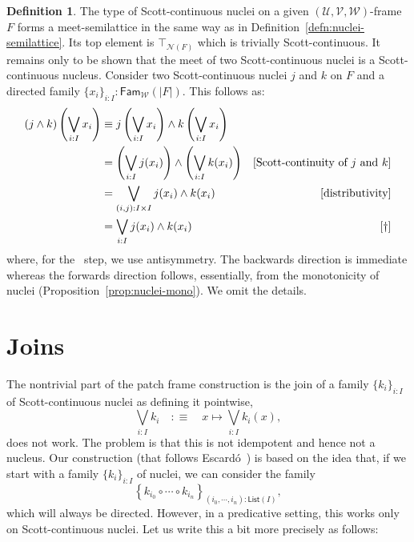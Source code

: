 \documentclass[a4paper, 11pt]{article}
\theoremstyle{definition}
\newtheorem{defn}{Definition}
\newcommand{\paren}[1]{\left( #1 \right)}
\newcommand{\UU}{\mathcal{U}}
\newcommand{\VV}{\mathcal{V}}
\newcommand{\WW}{\mathcal{W}}
\begin{document}
\begin{defn}\label{defn:sc-nuclei-semilattice}
  The type of Scott-continuous nuclei on a given $(\UU, \VV, \WW)$-frame $F$ forms a
  meet-semilattice in the same way as in Definition~\ref{defn:nuclei-semilattice}. Its top element
  is $\top_{\mathcal{N}(F)}$ which is trivially Scott-continuous. It remains only to be shown that the
  meet of two Scott-continuous nuclei is a Scott-continuous nucleus. Consider two Scott-continuous
  nuclei $j$ and $k$ on $F$ and a directed family $\{ x_i \}_{i : I} : \mathsf{Fam}_{\WW}(| F |)$.
  This follows as:
  \begin{align*}
    (j \wedge k) \left( \bigvee_{i : I} x_i \right)
    &\equiv j \left( \bigvee_{i : I} x_i \right) \wedge k \left( \bigvee_{i : I} x_i \right) & \\
    &= \paren{ \bigvee_{i : I} j(x_i) } \wedge \paren{ \bigvee_{i : I} k(x_i) } & [\text{Scott-continuity of $j$ and $k$}]\\
    &= \bigvee_{(i, j) : I \times I} j(x_i) \wedge k(x_i) & [\text{distributivity}]\\
    &= \bigvee_{i : I} j(x_i) \wedge k(x_i) & [\text{\dag}]
  \end{align*}
  where, for the \dag\ step, we use antisymmetry. The backwards direction is immediate whereas the
  forwards direction follows, essentially, from the monotonicity of nuclei
  (Proposition~\ref{prop:nuclei-mono}). We omit the details.
\end{defn}

\section{Joins}

The nontrivial part of the patch frame construction is the join of a family $\{ k_i \}_{i : I}$ of
Scott-continuous nuclei as defining it pointwise,
\begin{equation*}
  \bigvee_{i : I} k_i \quad:\equiv\quad x \mapsto \bigvee_{i : I} k_i(x),
\end{equation*}
does not work. The problem is that this is not idempotent and hence not a nucleus. Our construction
(that follows Escard\'{o}~\cite{properly-injective}) is based on the idea that, if we start with a
family $\{ k_i \}_{i : I}$ of nuclei, we can consider the family
\begin{equation*}
  \left\{ k_{i_0} \circ \cdots \circ k_{i_n} \right\}_{(i_0, \cdots, i_n) : \mathsf{List}(I)},
\end{equation*}
which will always be directed. However, in a predicative setting, this works only on
Scott-continuous nuclei. Let us write this a bit more precisely as follows:
\end{document}
